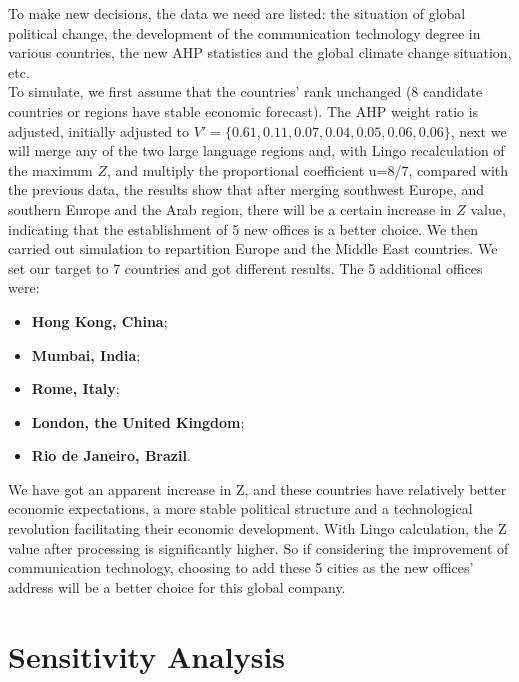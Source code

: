 \documentclass{mcmthesis}
\begin{document}
\hspace*{8mm}To make new decisions, the data we need are listed: the situation of global political change, the development of the communication technology degree in various countries, the new AHP statistics and the global climate change situation, etc. \\
\hspace*{8mm}To simulate, we first assume that the countries' rank unchanged (8 candidate countries or regions have stable economic forecast). The AHP weight ratio is adjusted, initially adjusted to $V'=\{0.61, 0.11, 0.07, 0.04, 0.05, 0.06, 0.06\}$, next we will merge any of the two large language regions and, with Lingo recalculation of the maximum $Z$, and multiply the proportional coefficient u=8/7, compared with the previous data, the results show that after merging southwest Europe, and southern Europe and the Arab region, there will be a certain increase in $Z$ value, indicating that the establishment of 5 new offices is a better choice. We then carried out simulation to repartition Europe and the Middle East countries. We set our target to 7 countries and got different results. The 5 additional offices were:
\begin{itemize}
\item \textbf{Hong Kong, China};
\item \textbf{Mumbai, India};
\item \textbf{Rome, Italy};
\item \textbf{London, the United Kingdom};
\item \textbf{Rio de Janeiro, Brazil}.
\end{itemize}
\hspace*{8mm}We have got an apparent increase in Z, and these countries have relatively better economic expectations, a more stable political structure and a technological revolution facilitating their economic development. With Lingo calculation, the Z value after processing is significantly higher. So if considering the improvement of communication technology, choosing to add these 5 cities as the new offices' address will be a better choice for this global company.

\section{Sensitivity Analysis}
\end{document}
